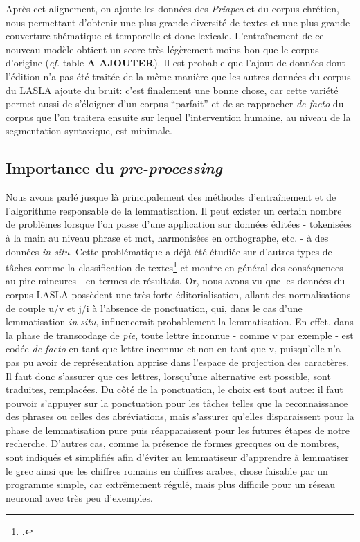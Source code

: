 Après cet alignement, on ajoute les données des \textit{Priapea} et du corpus chrétien, nous permettant d'obtenir une plus grande diversité de textes et une plus grande couverture thématique et temporelle et donc lexicale. L'entraînement de ce nouveau modèle obtient un score très légèrement moins bon que le corpus d'origine (\textit{cf.} table \textbf{A AJOUTER}). Il est probable que l'ajout de données dont l'édition n'a pas été traitée de la même manière que les autres données du corpus du LASLA ajoute du bruit: c'est finalement une bonne chose, car cette variété permet aussi de s'éloigner d'un corpus \enquote{parfait} et de se rapprocher \textit{de facto} du corpus que l'on traitera ensuite sur lequel l'intervention humaine, au niveau de la segmentation syntaxique, est minimale.

\subsection{Importance du \textit{pre-processing}}

Nous avons parlé jusque là principalement des méthodes d'entraînement et de l'algorithme responsable de la lemmatisation. Il peut exister un certain nombre de problèmes lorsque l'on passe d'une application sur données éditées - tokenisées à la main au niveau phrase et mot, harmonisées en orthographe, etc. - à des données \textit{in situ}. Cette problématique a déjà été étudiée sur d'autres types de tâches comme la classification de textes\footcite{camacho-collados_role_2018} et montre en général des conséquences - au pire mineures - en termes de résultats. Or, nous avons vu que les données du corpus LASLA possèdent une très forte éditorialisation, allant des normalisations de couple u/v et j/i à l'absence de ponctuation, qui, dans le cas d'une lemmatisation \textit{in situ}, influencerait probablement la lemmatisation. En effet, dans la phase de transcodage de \textit{pie}, toute lettre inconnue - comme v par exemple - est codée \textit{de facto} en tant que lettre inconnue et non en tant que v, puisqu'elle n'a pas pu avoir de représentation apprise dans l'espace de projection des caractères. Il faut donc s'assurer que ces lettres, lorsqu'une alternative est possible, sont traduites, remplacées. Du côté de la ponctuation, le choix est tout autre: il faut pouvoir s'appuyer sur la ponctuation pour les tâches telles que la reconnaissance des phrases ou celles des abréviations, mais s'assurer qu'elles disparaissent pour la phase de lemmatisation pure puis réapparaissent pour les futures étapes de notre recherche. D'autres cas, comme la présence de formes grecques ou de nombres, sont indiqués et simplifiés afin d'éviter au lemmatiseur d'apprendre à lemmatiser le grec ainsi que les chiffres romains en chiffres arabes, chose faisable par un programme simple, car extrêmement régulé, mais plus difficile pour un réseau neuronal avec très peu d'exemples.

